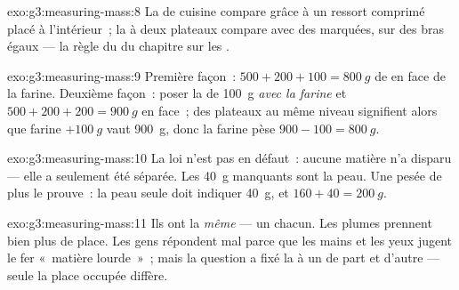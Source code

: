 \begin{solution}{exo:g3:measuring-mass:8}
La  de cuisine compare grâce à un ressort comprimé placé à
l'intérieur~; la  à deux plateaux compare avec des 
marquées, sur des bras égaux --- la règle du  du chapitre sur
les .
\end{solution}

\begin{solution}{exo:g3:measuring-mass:9}
Première façon~: $500 + 200 + 100 = \qty{800}{g}$ de  en face
de la farine. Deuxième façon~: poser la  de \qty{100}{g}
\emph{avec la farine} et $500 + 200 + 200 = \qty{900}{g}$ en face~;
des plateaux au même niveau signifient alors que farine
$+ \qty{100}{g}$ vaut \qty{900}{g}, donc la farine pèse
$900 - 100 = \qty{800}{g}$.
\end{solution}

\begin{solution}{exo:g3:measuring-mass:10}
La loi n'est pas en défaut~: aucune matière n'a disparu --- elle a
seulement été séparée. Les \qty{40}{g} manquants sont la peau. Une
pesée de plus le prouve~: la peau seule doit indiquer \qty{40}{g}, et
$160 + 40 = \qty{200}{g}$.
\end{solution}

\begin{solution}{exo:g3:measuring-mass:11}
Ils ont la \emph{même}  --- un  chacun. Les plumes
prennent bien plus de place. Les gens répondent mal parce que les
mains et les yeux jugent le fer «~matière lourde~»~; mais la question
a fixé la  à un  de part et d'autre --- seule la place
occupée diffère.
\end{solution}
